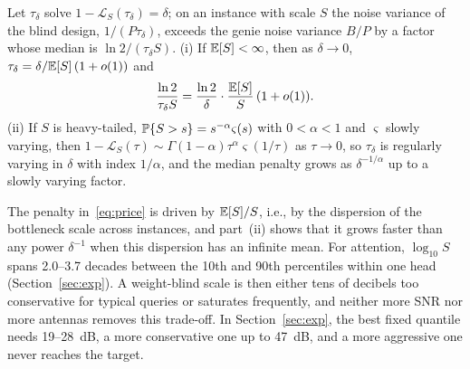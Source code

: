 \begin{corollary}\label{cor:blind}
Let $\tau_\delta$ solve $1-\mathcal{L}_S(\tau_\delta)=\delta$; on an instance with scale $S$ the noise variance of the blind design, $1/(P\tau_\delta)$, exceeds the genie noise variance $B/P$ by a factor whose median is $\ln2/(\tau_\delta S)$. (i) If $\mathbb{E}[S]<\infty$, then as $\delta\to0$, $\tau_\delta=\delta/\mathbb{E}[S]\,(1+o(1))$ and
\begin{equation}
\frac{\ln 2}{\tau_\delta S}=\frac{\ln2}{\delta}\cdot\frac{\mathbb{E}[S]}{S}\,(1+o(1)).
\label{eq:price}
\end{equation}
(ii) If $S$ is heavy-tailed, $\mathbb{P}\{S>s\}=s^{-\alpha}\varsigma(s)$ with $0<\alpha<1$ and $\varsigma$ slowly varying, then $1-\mathcal{L}_S(\tau)\sim\Gamma(1-\alpha)\tau^\alpha\varsigma(1/\tau)$ as $\tau\to0$, so $\tau_\delta$ is regularly varying in $\delta$ with index $1/\alpha$, and the median penalty grows as $\delta^{-1/\alpha}$ up to a slowly varying factor.
\end{corollary}

The penalty in~\eqref{eq:price} is driven by $\mathbb{E}[S]/S$, i.e., by the dispersion of the bottleneck scale across instances, and part~(ii) shows that it grows faster than any power $\delta^{-1}$ when this dispersion has an infinite mean. For attention, $\log_{10}S$ spans 2.0--3.7 decades between the 10th and 90th percentiles within one head (Section~\ref{sec:exp}). A weight-blind scale is then either tens of decibels too conservative for typical queries or saturates frequently, and neither more SNR nor more antennas removes this trade-off. In Section~\ref{sec:exp}, the best fixed quantile needs 19--28~dB, a more conservative one up to 47~dB, and a more aggressive one never reaches the target.
